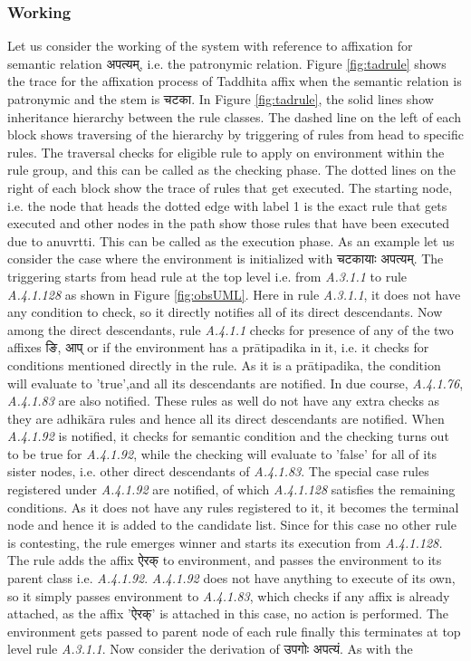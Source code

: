 \documentclass[a4paper,11pt,twoside,openright]{report}
\begin{document}
\subsubsection{Working}
\label{sect:woring}
Let us consider the working of the system with reference to affixation for semantic relation {\skt अपत्यम्}, i.e. the patronymic relation. Figure \ref{fig:tadrule} shows the trace for the affixation process of Taddhita affix when the semantic relation is patronymic and the stem is {\skt चटका}. In Figure \ref{fig:tadrule}, the solid lines show inheritance hierarchy between the rule classes. The dashed line on the left of each block shows traversing of the hierarchy by triggering of rules from head to specific rules. The traversal checks for eligible rule to apply on environment within the rule group, and this can be called as the checking phase. The dotted lines on the right of each block show the trace of rules that get executed. The starting node, i.e. the node that heads the dotted edge with label 1 is the exact rule that gets executed and other nodes in the path show those rules that have been executed due to anuvrtti. This can be called as the execution phase. As an example let us consider the case where the environment is initialized with {\skt चटकायाः अपत्यम्}.  The triggering starts from head rule at the top level i.e. from  \textsl{ A.3.1.1} to rule  \textsl{ A.4.1.128} as shown in Figure \ref{fig:obsUML}. Here in rule \textsl{ A.3.1.1}, it does not have any condition to check, so it directly notifies all of its direct descendants. Now among the direct descendants, rule \textsl{ A.4.1.1} checks for presence of any of the two affixes {\skt ङि, आप्} or if the environment has a prātipadika in it, i.e. it checks for conditions mentioned directly in the rule. As it is a prātipadika, the condition will evaluate to 'true',and all its descendants are notified. In due course, \textsl{ A.4.1.76}, \textsl{ A.4.1.83} are also notified. These rules as well do not have any extra checks as they are adhikāra rules and hence all its direct descendants are notified. When \textsl{ A.4.1.92} is notified, it checks for semantic condition and the checking turns out to be true for \textsl{ A.4.1.92}, while the checking will evaluate to 'false' for all of its sister nodes, i.e. other direct descendants of \textsl{ A.4.1.83}. The special case rules registered under \textsl{ A.4.1.92} are notified, of which \textsl{ A.4.1.128} satisfies the remaining conditions. As it does not have any rules registered to it, it becomes the terminal node and hence it is added to the candidate list. Since for this case no other rule is contesting, the rule emerges winner and starts its execution from \textsl{ A.4.1.128.} The rule adds the affix {\skt ऐरक्} to environment, and passes the environment to its parent class i.e. \textsl{ A.4.1.92}. \textsl{ A.4.1.92} does not have anything to execute of its own, so it simply passes environment to \textsl{ A.4.1.83}, which checks if any affix is already attached, as the affix '{\skt ऐरक्}' is attached in this case, no action is performed. The environment gets passed to parent node of each rule finally this terminates at top level rule \textsl{ A.3.1.1}. Now consider the derivation of {\skt उपगोः अपत्यं}. As with the 
\end{document}
